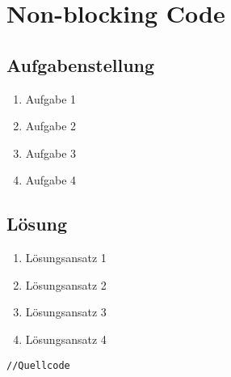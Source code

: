 \section{Non-blocking Code}
\subsection{Aufgabenstellung}

\begin{enumerate}%
		\item Aufgabe 1
		\item Aufgabe 2
		\item Aufgabe 3
		\item Aufgabe 4
		
\end{enumerate}

\subsection{Lösung}
\begin{enumerate}
		\item Lösungsansatz 1
		\item Lösungsansatz 2
		\item Lösungsansatz 3
		\item Lösungsansatz 4
\end{enumerate}


\begin{lstlisting}[frame=htrbl, caption={Listening Bezeichnung}, label={lst:Referenzname}]
//Quellcode
\end{lstlisting}

